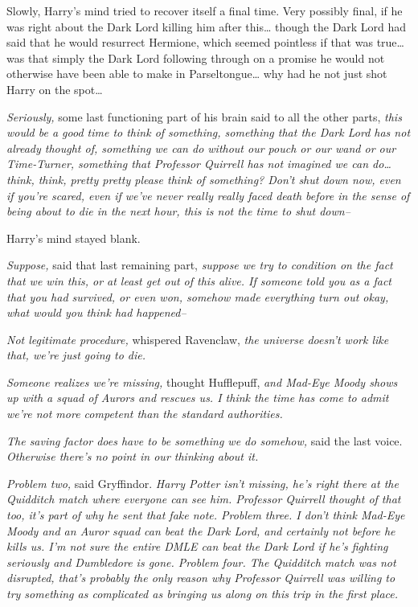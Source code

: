Slowly, Harry's mind tried to recover itself a final time. Very possibly final, if he was right about the Dark Lord killing him after this{\ldots} though the Dark Lord had said that he would resurrect Hermione, which seemed pointless if that was true{\ldots} was that simply the Dark Lord following through on a promise he would not otherwise have been able to make in Parseltongue{\ldots} why had he not just shot Harry on the spot{\ldots}

\emph{Seriously,} some last functioning part of his brain said to all the other parts, \emph{this would be a good time to think of something, something that the Dark Lord has not already thought of, something we can do without our pouch or our wand or our Time-Turner, something that Professor Quirrell has not imagined we can do{\ldots} think, think, pretty pretty please think of something? Don't shut down now, even if you're scared, even if we've never really really faced death before in the sense of being about to die in the next hour, \emph{this is not the time to shut down\---}}

Harry's mind stayed blank.

\emph{Suppose,} said that last remaining part, \emph{suppose we try to condition on the fact that we win this, or at least get out of this alive. If someone \emph{told you as a fact} that you had survived, or even won, somehow made everything turn out okay, what would you think had happened\---}

\emph{Not legitimate procedure,} whispered Ravenclaw, \emph{the universe doesn't work like that, we're just going to die.}

\emph{Someone realizes we're missing,} thought Hufflepuff, \emph{and Mad-Eye Moody shows up with a squad of Aurors and rescues us. I think the time has come to admit we're not more competent than the standard authorities.}

\emph{The saving factor does have to be something we \emph{do} somehow,} said the last voice. \emph{Otherwise there's no point in our thinking about it.}

\emph{Problem two,} said Gryffindor. \emph{Harry Potter isn't missing, he's right there at the Quidditch match where everyone can see him. Professor Quirrell thought of that too, it's part of why he sent that fake note. Problem three. I don't think Mad-Eye Moody and an Auror squad can beat the Dark Lord, and certainly not before he kills us. I'm not sure the entire DMLE can beat the Dark Lord if he's fighting seriously and Dumbledore is gone. Problem four. The Quidditch match was not disrupted, that's probably the only reason why Professor Quirrell was willing to try something as complicated as bringing us along on this trip in the first place.}

